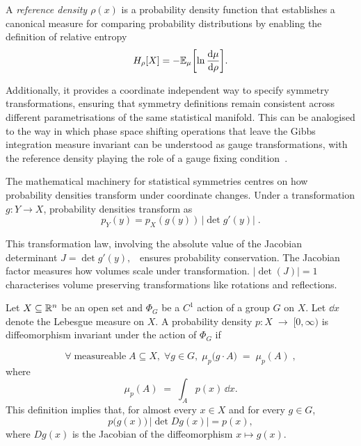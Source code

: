         \begin{definition}
        A \emph{reference density \(\rho(x)\)} is a probability density function that establishes a canonical measure for comparing probability distributions by enabling the definition of relative entropy
        \[
            H_\rho[X] = -\mathbb{E}_\mu\qty[\ln\frac{\dd\mu}{\dd\rho}].
        \]
        \end{definition}
        
        Additionally, it provides a coordinate independent way to specify symmetry transformations, ensuring that symmetry definitions remain consistent across different parametrisations of the same statistical manifold.
        This can be analogised to the way in which phase space shifting operations that leave the Gibbs integration measure invariant can be understood as gauge transformations, with the reference density playing the role of a gauge fixing condition~\cite{Muller:2024rlq}.
        
        The mathematical machinery for statistical symmetries centres on how probability densities transform under coordinate changes.
        Under a transformation \(g: Y \to X\), probability densities transform as
            \[
                p_Y(y) = p_X(g(y))\,|\det g'(y) |\;.
            \]
            
        This transformation law, involving the absolute value of the Jacobian determinant \(J = \det g'(y),\)~\cite{jacobi_determinantibus_1841} ensures probability conservation.
        The Jacobian factor measures how volumes scale under transformation.
        \(|\det(J)| = 1\) characterises volume preserving transformations like rotations and reflections.

        \begin{definition}
        Let $X\subseteq\mathbb{R}^n$ be an open set and \(\Phi_G\) be a $C^1$ action of a group $G$ on $X$. 
        Let $\dd x$ denote the Lebesgue measure on $X$.
        A probability density \(p : X \;\to\; [0,\infty)\) is diffeomorphism invariant under the action of \(\Phi_G\) if

\[
    \forall \;\text{measureable} \;A \subseteq X,\; \forall g\in G,\;
    \mu_p\bigl(g\cdot A\bigr)\;=\;\mu_p(A)\;,
\]
where \[
    \mu_p(A)\;=\;\int_A p(x)\,\dd x.
    \]
This definition implies that, for almost every $x\in X$ and for every $g\in G$,
\[
    p\bigl(g(x)\bigr)\,\bigl|\det Dg(x)\bigr| = p(x),
\]
where $Dg(x)$ is the Jacobian of the diffeomorphism $x\mapsto g(x)$.
\end{definition}

